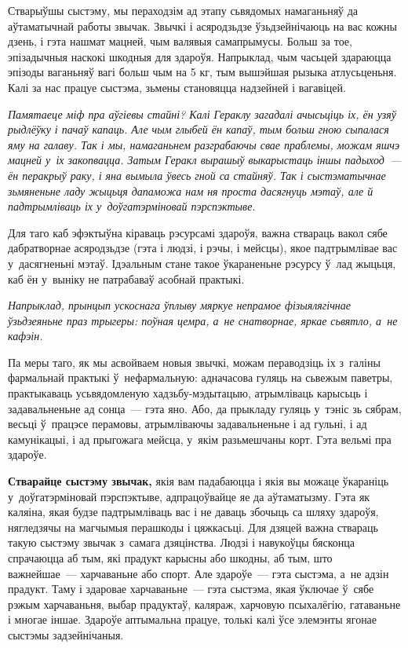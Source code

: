 Стварыўшы сыстэму, мы пераходзім ад этапу сьвядомых намаганьняў да аўтаматычнай работы звычак. Звычкі і асяродзьдзе ўзьдзейнічаюць на вас кожны дзень, і гэта нашмат мацней, чым валявыя самапрымусы. Больш за тое, эпізадычныя наскокі шкодныя для здароўя. Напрыклад, чым часьцей здараюцца эпізоды ваганьняў вагі больш чым на 5 кг, тым вышэйшая рызыка атлусьценьня. Калі за нас працуе сыстэма, зьмены становяцца надзейней і вагавіцей.

\emph{Памятаеце міф пра аўгіевы стайні? Калі Гераклу загадалі ачысьціць іх, ён узяў рыдлёўку і пачаў капаць. Але чым глыбей ён капаў, тым больш гною сыпалася яму на галаву. Так і мы, намаганьнем разграбаючы свае праблемы, можам яшчэ мацней у~іх закопвацца. Затым Геракл вырашыў выкарыстаць іншы падыход~--- ён перакрыў раку, і яна вымыла ўвесь гной са стайняў. Так і сыстэматычнае зьмяненьне ладу жыцьця дапаможа нам ня проста дасягнуць мэтаў, але й падтрымліваць іх у~доўгатэрміновай пэрспэктыве.}

Для таго каб эфэктыўна кіраваць рэсурсамі здароўя, важна ствараць вакол сябе дабратворнае асяродзьдзе (гэта і людзі, і рэчы, і мейсцы), якое падтрымлівае вас у~дасягненьні мэтаў. Ідэальным стане такое ўкараненьне рэсурсу ў~лад жыцьця, каб ён у~выніку не патрабаваў асобнай практыкі.

\emph{Напрыклад, прынцып ускоснага ўплыву мяркуе непрамое фізыялягічнае ўзьдзеяньне праз трыгеры: поўная цемра, а~не снатворнае, яркае сьвятло, а~не кафэін.}

Па меры таго, як мы асвойваем новыя звычкі, можам пераводзіць іх з~галіны фармальнай практыкі ў~нефармальную: адначасова гуляць на сьвежым паветры, практыкаваць усьвядомленую хадзьбу-мэдытацыю, атрымліваць карысьць і задавальненьне ад сонца~--- гэта яно. Або, да прыкладу гуляць у~тэніс зь сябрам, весьці ў~працэсе перамовы, атрымліваючы задавальненьне і ад гульні, і ад камунікацыі, і ад прыгожага мейсца, у~якім разьмешчаны корт. Гэта вельмі пра здароўе.

\textbf{Стварайце сыстэму звычак,} якія вам падабаюцца і якія вы можаце ўкараніць у~доўгатэрміновай пэрспэктыве, адпрацоўвайце яе да аўтаматызму. Гэта як каляіна, якая будзе падтрымліваць вас і не даваць збочыць са шляху здароўя, нягледзячы на магчымыя перашкоды і цяжкасьці. Для дзяцей важна ствараць такую сыстэму звычак з~самага дзяцінства. Людзі і навукоўцы бясконца спрачаюцца аб тым, які прадукт карысны або шкодны, аб тым, што важнейшае~--- харчаваньне або спорт. Але здароўе~--- гэта сыстэма, а~не адзін прадукт. Таму і здаровае харчаваньне~--- гэта сыстэма, якая ўключае ў~сябе рэжым харчаваньня, выбар прадуктаў, каляраж, харчовую псыхалёгію, гатаваньне і многае іншае. Здароўе аптымальна працуе, толькі калі ўсе элемэнты ягонае сыстэмы задзейнічаныя.

